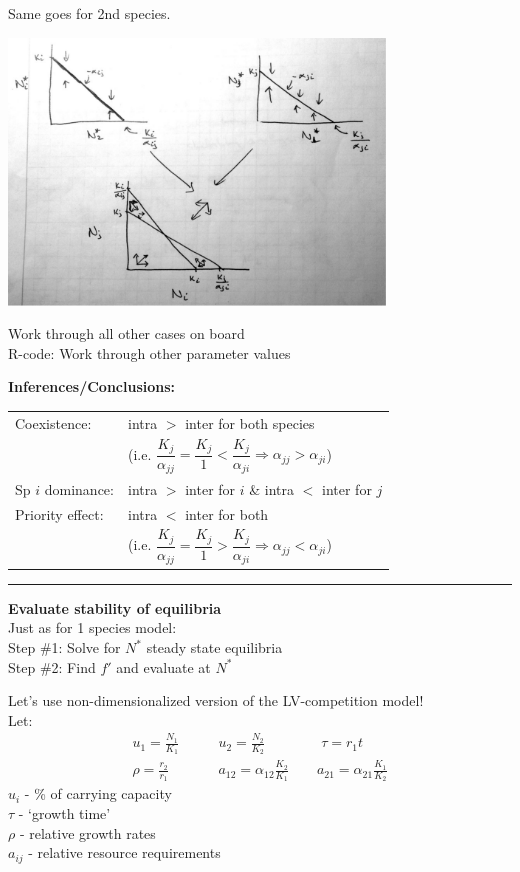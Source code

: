 \documentclass{article}
\newcommand{\note}[1]{\colorbox{gray!30}{#1}}
\newcommand{\ind}{\-\hspace{1cm}}
\begin{document}
Same goes for 2nd species.
\begin{center}
\includegraphics[width=10cm]{figs/LV_comp_isoclines.pdf}
\end{center}
\note{Work through all other cases on board}\\
\note{R-code: Work through other parameter values}

\pagebreak

\textbf{Inferences/Conclusions:}

\begin{table}[h]
\centering
\begin{tabular}{ll}
Coexistence: & intra $>$ inter for both species  \\
& \ind \ind (i.e. $\dfrac{K_j}{\alpha_{jj}}=\dfrac{K_j}{1} < \dfrac{K_j}{\alpha_{ji}} \Rightarrow \alpha_{jj}>\alpha_{ji}$)\\
Sp $i$ dominance: & intra $>$ inter for $i$ \& intra $<$ inter for $j$\\
Priority effect: & intra $<$ inter for both\\
& \ind \ind (i.e. $\dfrac{K_j}{\alpha_{jj}}=\dfrac{K_j}{1} > \dfrac{K_j}{\alpha_{ji}} \Rightarrow \alpha_{jj}<\alpha_{ji}$)
\end{tabular} 
\end{table}

\rule[0.5ex]{\linewidth}{1pt}


\textbf{Evaluate stability of equilibria} \\
Just as for 1 species model:\\
\ind Step \#1: Solve for $N^*$ steady state equilibria\\
\ind Step \#2: Find $f'$ and evaluate at $N^*$

Let's use non-dimensionalized version of the LV-competition model!\\
Let:
\begin{align*}
	u_1 = \frac{N_1}{K_1} \quad & \quad u_2 = \frac{N_2}{K_2} \quad  \quad \quad \quad \tau = r_1 t\\
	\rho = \frac{r_2}{r_1} \quad & \quad a_{12}=\alpha_{12}\frac{K_2}{K_1} \quad \quad a_{21}=\alpha_{21}\frac{K_1}{K_2} 
\end{align*}
\ind $u_i$ - \% of carrying capacity\\
\ind $\tau$ - `growth time'\\
\ind $\rho$ - relative growth rates\\
\ind $a_{ij}$ - relative resource requirements\\
\end{document}
